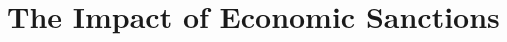 \documentclass[11pt,letterpaper, notitlepage]{article}
\begin{document}
\section{The Impact of Economic Sanctions}
\label{sec:sanctions}





\end{document}
